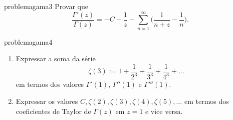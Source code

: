 \begin{restatable}{problema}{gama3}\label{gama3}
Provar que
\begin{equation}
\frac{\Gamma'(z)}{\Gamma(z)} = - C - \frac{1}{z} - \sum_{n=1}^\infty \big(\frac{1}{n+z} - \frac{1}{n}\big).
\end{equation}
\end{restatable}

\begin{restatable}{problema}{gama4}\label{gama4}
\begin{enumerate}
\item Expressar a soma da série
\[ \zeta(3) := 1 + \frac{1}{2^3} + \frac{1}{3^3} + \frac{1}{4^3} + \dots \]
em termos dos valores $\Gamma'(1)$, $\Gamma''(1)$ e $\Gamma'''(1)$.
\item Expressar os valores $C,\zeta(2),\zeta(3),\zeta(4),\zeta(5),\dots$
em termos dos coeficientes de Taylor de $\Gamma(z)$ em $z=1$ e vice versa.
\end{enumerate}
\end{restatable}

% 

